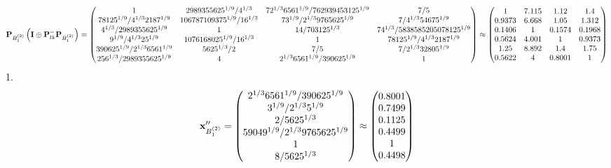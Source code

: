 \documentclass[10pt,a4paper]{article}
\begin{document}
	\[
		\bold{P}_{B_1^{(2)}}\left(\bold{I} \oplus \bold{P}_{lk}^{-}\bold{P}_{B_1^{(2)}}\right) = 
		\begin{pmatrix}
			{1}{} & {{2989355625^ {1 / 9}}} / {{4^ {1 / 3}}} & {{7}{2^ {1 / 3}}{6561^ {1 / 9}}} / {{762939453125^ {1 / 9}}} & {{7}} / {{5}} \\
			{{78125^ {1 / 9}}} / {{4^ {1 / 3}}{2187^ {1 / 9}}} & {{106787109375^ {1 / 9}}} / {{16^ {1 / 3}}} & {{7}{3^ {1 / 9}}} / {{2^ {1 / 3}}{9765625^ {1 / 9}}} & {{7}} / {{4^ {1 / 3}}{54675^ {1 / 9}}} \\
			{{4^ {1 / 3}}} / {{2989355625^ {1 / 9}}} & {1}{} & {{14}} / {{703125^ {1 / 3}}} & {{7}{4^ {1 / 3}}} / {{5838585205078125^ {1 / 9}}} \\
			{{9^ {1 / 9}}} / {{4^ {1 / 3}}{25^ {1 / 9}}} & {{1076168025^ {1 / 9}}} / {{16^ {1 / 3}}} & {1}{} & {{78125^ {1 / 9}}} / {{4^ {1 / 3}}{2187^ {1 / 9}}} \\
			{{390625^ {1 / 9}}} / {{2^ {1 / 3}}{6561^ {1 / 9}}} & {{5625^ {1 / 3}}} / {{2}} & {{7}} / {{5}} & {{7}} / {{2^ {1 / 3}}{32805^ {1 / 9}}} \\
			{{256^ {1 / 3}}} / {{2989355625^ {1 / 9}}} & {{4}}{} & {{2^ {1 / 3}}{6561^ {1 / 9}}} / {{390625^ {1 / 9}}} & {1}{} \\
		\end{pmatrix}
		\approx
		\begin{pmatrix}
			1        & 7.115    & 1.12     & 1.4      \\
			0.9373   & 6.668    & 1.05     & 1.312    \\
			0.1406   & 1        & 0.1574   & 0.1968   \\
			0.5624   & 4.001    & 1        & 0.9373   \\
			1.25     & 8.892    & 1.4      & 1.75     \\
			0.5622   & 4        & 0.8001   & 1        \\
		\end{pmatrix}
	\]
	1.
	\[
		\bold{x}''_{B_1^{(2)}} = 
		\begin{pmatrix}
			{{2^ {1 / 3}}{6561^ {1 / 9}}} / {{390625^ {1 / 9}}} \\
			{{3^ {1 / 9}}} / {{2^ {1 / 3}}{5^ {1 / 9}}} \\
			{{2}} / {{5625^ {1 / 3}}} \\
			{{59049^ {1 / 9}}} / {{2^ {1 / 3}}{9765625^ {1 / 9}}} \\
			{1}{} \\
			{{8}} / {{5625^ {1 / 3}}} \\
		\end{pmatrix}
		\approx
		\begin{pmatrix}
			0.8001   \\
			0.7499   \\
			0.1125   \\
			0.4499   \\
			1        \\
			0.4498   \\
		\end{pmatrix}
	\]
\end{document}
